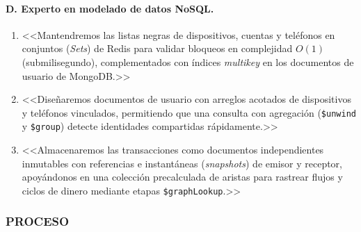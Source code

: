 \documentclass[11pt,a4paper]{article}
\begin{document}
	\paragraph{D. Experto en modelado de datos NoSQL.}
	\begin{enumerate}[leftmargin=2em]
		\item <<Mantendremos las listas negras de dispositivos, cuentas y teléfonos en conjuntos (\textit{Sets}) de Redis para validar bloqueos en complejidad $O(1)$ (submilisegundo), complementados con índices \textit{multikey} en los documentos de usuario de MongoDB.>>
		\item <<Diseñaremos documentos de usuario con arreglos acotados de dispositivos y teléfonos vinculados, permitiendo que una consulta con agregación (\texttt{\$unwind} y \texttt{\$group}) detecte identidades compartidas rápidamente.>>
		\item <<Almacenaremos las transacciones como documentos independientes inmutables con referencias e instantáneas (\textit{snapshots}) de emisor y receptor, apoyándonos en una colección precalculada de aristas para rastrear flujos y ciclos de dinero mediante etapas \texttt{\$graphLookup}.>>
	\end{enumerate}
	
	\subsubsection*{PROCESO}
	
\end{document}
